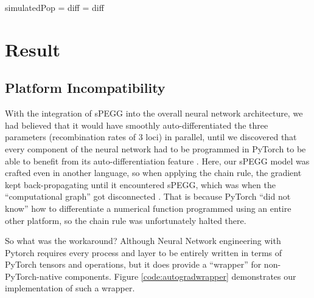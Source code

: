 \documentclass[12pt]{article}
\begin{document}
\begin{algorithm}
    \begin{algorithmic}[1]
            \State simulatedPop = 
            \State diff = 
            \State \Return diff
        \EndFunction
    \end{algorithmic}
    \vspace{0.6em}
    \caption{Loss function. First, it has predicted parameters from the neural net fed into sPEGG to simulate a population data. Then, such simulated data are compared against the training data using an MSE function.}
    \label{alg:loss}
\end{algorithm}

\section{Result}
\subsection{Platform Incompatibility}

With the integration of sPEGG into the overall neural network architecture, we had believed that it would have smoothly auto-differentiated the three parameters (recombination rates of 3 loci) in parallel, until we discovered that every component of the neural network had to be programmed in PyTorch to be able to benefit from its auto-differentiation feature \cite{paszke2017automatic}. Here, our sPEGG model was crafted even in another language, so when applying the chain rule, the gradient kept back-propagating until it encountered sPEGG, which was when the \enquote{computational graph} got disconnected \cite{paszke2017automatic}. That is because PyTorch \enquote{did not know} how to differentiate a numerical function programmed using an entire other platform, so the chain rule was unfortunately halted there.

So what was the workaround? Although Neural Network engineering with Pytorch requires every process and layer to be entirely written in terms of PyTorch tensors and operations, but it does provide a \enquote{wrapper} for non-PyTorch-native components. Figure \ref{code:autogradwrapper} demonstrates our implementation of such a wrapper.
\end{document}
